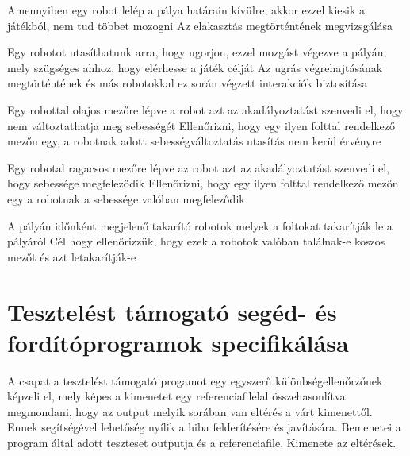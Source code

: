 %
{Amennyiben egy robot lelép a pálya határain kívülre, akkor ezzel kiesik a játékból, nem tud többet mozogni}%
{Az elakasztás megtörténtének megvizsgálása}

%
{Egy robotot utasíthatunk arra, hogy ugorjon, ezzel mozgást végezve a pályán, mely szügséges ahhoz, hogy elérhesse a játék célját}%
{Az ugrás végrehajtásának megtörténtének és más robotokkal ez során végzett interakciók biztosítása}

%
{Egy robottal olajos mezőre lépve a robot azt az akadályoztatást szenvedi el, hogy nem változtathatja meg sebességét}%
{Ellenőrizni, hogy egy ilyen folttal rendelkező mezőn egy, a robotnak adott sebességváltoztatás utasítás nem kerül érvényre}

%
{Egy robotal ragacsos mezőre lépve az robot azt az akadályoztatást szenvedi el, hogy sebessége megfeleződik}%
{Ellenőrizni, hogy egy ilyen folttal rendelkező mezőn egy a robotnak a sebessége valóban megfeleződik}

%
{A pályán időnként megjelenő takarító robotok melyek a foltokat takarítják le a pályáról}%
{Cél hogy ellenőrizzük, hogy ezek a robotok valóban találnak-e koszos mezőt és azt letakarítják-e}

\section{Tesztelést támogató segéd- és fordítóprogramok specifikálása}
A csapat a tesztelést támogató progamot egy egyszerű különbségellenőrzőnek képzeli el, mely képes a kimenetet egy referenciafilelal összehasonlítva megmondani,
hogy az output melyik sorában van eltérés a várt kimenettől. Ennek segítségével lehetőség nyílik a hiba felderítésére és javítására. Bemenetei a program által adott
teszteset outputja és a referenciafile. Kimenete az eltérések. 

